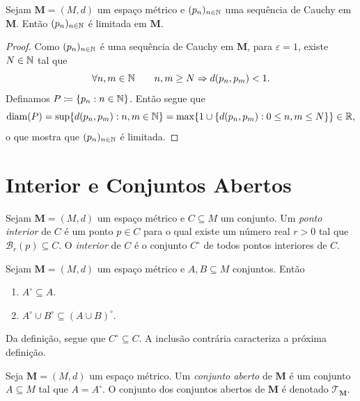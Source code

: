 \begin{prop}
	Sejam $\bm M = (M,d)$ um espaço métrico e $(p_n)_{n \in \mathbb{N}}$ uma sequência de Cauchy em $\bm M$. Então $(p_n)_{n \in \mathbb{N}}$ é limitada em $\bm M$.
\end{prop}
\begin{proof}
	Como $(p_n)_{n \in \mathbb{N}}$ é uma sequência de Cauchy em $\bm M$, para $\varepsilon=1$, existe $N \in \mathbb{N}$ tal que
	\begin{equation*}
	\forall n,m \in \mathbb{N} \qquad n,m \geq N \Rightarrow d(p_n,p_m)<1.
	\end{equation*}
	Definamos $P \coloneqq \{p_n : n \in \N\}$. Então segue que
	\begin{equation*}
	\operatorname{diam}(P) = \sup \{d(p_n,p_m) : n,m \in \mathbb{N}\} = \max\{1 \cup \{d(p_n,p_m) : 0 \leq n,m \leq N\}\} \in \mathbb{R},
	\end{equation*}
o que mostra que $(p_n)_{n \in \mathbb{N}}$ é limitada.
\end{proof}

\section{Interior e Conjuntos Abertos}

\begin{defi}
	Sejam $\bm M = (M,d)$ um espaço métrico e $C \subseteq M$ um conjunto. Um \emph{ponto interior} de $C$ é um ponto $p \in C$ para o qual existe um número real $r > 0$ tal que $\mathcal B_r(p) \subseteq C$. O \emph{interior} de $C$ é o conjunto $C^\circ$ de todos pontos interiores de $C$.
\end{defi}


\begin{prop}
	Sejam $\bm M = (M,d)$ um espaço métrico e $A,B \subseteq M$ conjuntos. Então
	\begin{enumerate}
	\item $A^\circ \subseteq A$.
	\item $A^\circ \cup B^\circ \subseteq (A \cup B)^\circ$.
	\end{enumerate}
\end{prop}

Da definição, segue que $C^\circ \subseteq C$. A inclusão contrária caracteriza a próxima definição.

\begin{defi}
	Seja $\bm M = (M,d)$ um espaço métrico. Um \emph{conjunto aberto} de $\bm M$ é um conjunto $A \subseteq M$ tal que $A = A^\circ$. O conjunto dos conjuntos abertos de $\bm M$ é denotado $\mathcal T_{\bm M}$.
\end{defi}

